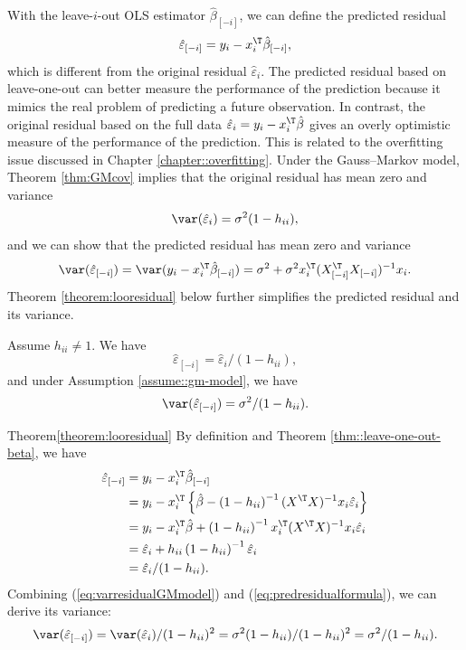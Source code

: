 With the leave-$i$-out OLS estimator $\hat{\beta}_{[-i]}$, we can
define the predicted residual
\[
\hat{\varepsilon}_{[-i]}=y_{i}-x_{i}^{\T}\hat{\beta}_{[-i]},
\]
which is different from the original residual $\hat{\varepsilon}_{i}.$ The
predicted residual based on leave-one-out can better measure the performance
of the prediction because it mimics the real problem of predicting a 
future observation. In contrast, the original residual based on the full
data $\hat{\varepsilon}_i = y_i - x_i^{\T} \hat{\beta}$ gives an overly optimistic measure of the performance of the prediction. This is related
to the overfitting issue discussed in Chapter \ref{chapter::overfitting}. Under the Gauss--Markov
model, Theorem \ref{thm:GMcov} implies that the original residual
has mean zero and variance
\begin{equation}
\var(\hat{\varepsilon}_{i})=\sigma^{2}(1-h_{ii}),\label{eq:varresidualGMmodel}
\end{equation}
and we can show that the predicted residual has mean zero and variance
\begin{equation}
\var(\hat{\varepsilon}_{[-i]})=\var(y_{i}-x_{i}^{\T}\hat{\beta}_{[-i]})=\sigma^{2}+\sigma^{2}x_{i}^{\T}(X_{[-i]}^{\T}X_{[-i]})^{-1}x_{i}.\label{eq:varpresidual-1}
\end{equation}
Theorem \ref{theorem:looresidual} below further simplifies the predicted residual and
its variance.

\begin{theorem}
\label{theorem:looresidual}
Assume $h_{ii} \neq 1$. 
We have 
$$
\hat{\varepsilon}_{[-i]}=\hat{\varepsilon}_{i}/(1-h_{ii}),
$$
and under Assumption \ref{assume::gm-model}, we have 
\begin{equation}
\var(\hat{\varepsilon}_{[-i]})=\sigma^{2}/(1-h_{ii}).\label{eq:varpresidual-2}
\end{equation}
\end{theorem}

\begin{myproof}{Theorem}{\ref{theorem:looresidual}}
By definition and Theorem \ref{thm::leave-one-out-beta}, we have
\begin{align}
\hat{\varepsilon}_{[-i]} & =y_{i}-x_{i}^{\T}\hat{\beta}_{[-i]}\nonumber \\
 & =y_{i}-x_{i}^{\T}\left\{ \hat{\beta}-\left(1-h_{ii}\right)^{-1}(X^{\T}X)^{-1}x_{i}\hat{\varepsilon}_{i}\right\} \nonumber \\
 & =y_{i}-x_{i}^{\T}\hat{\beta}+\left(1-h_{ii}\right)^{-1}x_{i}^{\T}(X^{\T}X)^{-1}x_{i}\hat{\varepsilon}_{i}\nonumber \\
 & =\hat{\varepsilon}_{i}+h_{ii}\left(1-h_{ii}\right)^{-1}\hat{\varepsilon}_{i}\nonumber \\
 & =\hat{\varepsilon}_{i}/(1-h_{ii})\text{.}\label{eq:predresidualformula}
\end{align}
Combining (\ref{eq:varresidualGMmodel}) and (\ref{eq:predresidualformula}), we can derive its variance:
$$
\var(\hat{\varepsilon}_{[-i]})
= \var( \hat{\varepsilon}_{i} ) / (1-h_{ii})^2
= \sigma^{2}(1-h_{ii}) / (1-h_{ii})^2
=\sigma^{2}/(1-h_{ii}) . 
$$
\end{myproof}



